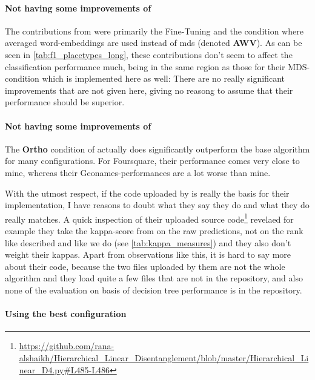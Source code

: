 \paragraph{Not having some improvements of \cite{Ager2018}}
The contributions from \cite{Ager2018} were primarily the Fine-Tuning and the condition where averaged word-embeddings are used instead of \gls{mds} (denoted \textbf{AWV}). As can be seen in \autoref{tab:f1_placetypes_long}, these contributions don't seem to affect the classification performance much, being in the same region as those for their MDS-condition which is implemented here as well: There are no really significant improvements that are not given here, giving no reasong to assume that their performance should be superior.  

\paragraph{Not having some improvements of \cite{Alshaikh2020}}

The \textbf{Ortho} condition of \cite{Alshaikh2020} actually does significantly outperform the base algorithm for many configurations. For Foursquare, their performance comes very close to mine, whereas their Geonames-performances are a lot worse than mine.

With the utmost respect, if the code uploaded by \cite{Alshaikh2020} is really the basis for their implementation, I have reasons to doubt what they say they do and what they do really matches. A quick inspection of their uploaded source code\footnote{\url{https://github.com/rana-alshaikh/Hierarchical_Linear_Disentanglement/blob/master/Hierarchical_Linear_D4.py\#L485-L486}} revelaed for example they take the kappa-score from on the raw predictions, not on the rank like \cite{Derrac2015} described and like we do (see \autoref{tab:kappa_measures}) and they also don't weight their kappas. Apart from observations like this, it is hard to say more about their code, because the two files uploaded by them are not the whole algorithm and they load quite a few files that are not in the repository, and also none of the evaluation on basis of decision tree performance is in the repository.

\paragraph{Using the best configuration}

